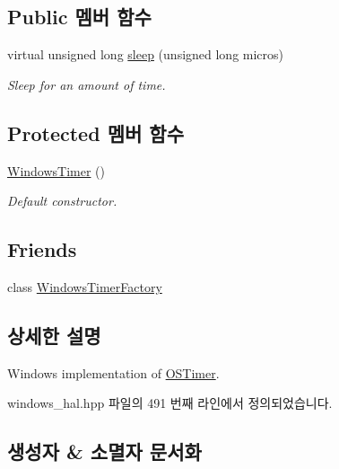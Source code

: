 \subsection*{Public 멤버 함수}
\begin{DoxyCompactItemize}
\item 
virtual unsigned long \hyperlink{class_windows_timer_af022816036d95a2e4b89406f05f49505}{sleep} (unsigned long micros)
\begin{DoxyCompactList}\small\item\em Sleep for an amount of time. \end{DoxyCompactList}\end{DoxyCompactItemize}
\subsection*{Protected 멤버 함수}
\begin{DoxyCompactItemize}
\item 
\hyperlink{class_windows_timer_a60e558521eb1a1041c43a35bd40bfd17}{Windows\+Timer} ()
\begin{DoxyCompactList}\small\item\em Default constructor. \end{DoxyCompactList}\end{DoxyCompactItemize}
\subsection*{Friends}
\begin{DoxyCompactItemize}
\item 
class \hyperlink{class_windows_timer_ab86e064bdc9f1f01440c7506e79008f9}{Windows\+Timer\+Factory}
\end{DoxyCompactItemize}


\subsection{상세한 설명}
Windows implementation of \hyperlink{class_o_s_timer}{O\+S\+Timer}. 

windows\+\_\+hal.\+hpp 파일의 491 번째 라인에서 정의되었습니다.



\subsection{생성자 \& 소멸자 문서화}
